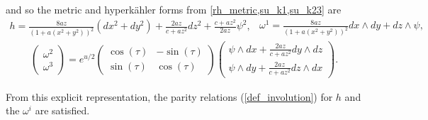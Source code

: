 \documentclass[a4paper,12pt, onecolumn, notitlepage]{article}
\theoremstyle{definition}
\theoremstyle{remark}
\newcommand{\w}{\omega}
\newcommand{\HK}{hyperk\"ahler }
\begin{document}
	and so the metric and \HK forms from \cref{rh_metric,su_k1,su_k23} are
\begin{subequations}
	\begin{gather}
	\label{su_metric}
	h = \frac{8az}{(1+a(x^{2} + y^{2}))^{2}}(dx^{2}+dy^{2}) + \frac{2az}{c+az^{2}}dz^{2} +
	\frac{c+az^{2}}{2az}\psi^{2},
	\end{gather}
	\begin{gather}
	\label{su_kahler1}
	\w^{1} = \frac{8az}{(1+a(x^{2} + y^{2}))^{2}}dx\wedge dy + dz \wedge \psi,
	\end{gather}
\end{subequations}
\begin{gather}
	\begin{pmatrix}
	\w^{2}\\
	\w^{3}
	\end{pmatrix}
	=
	e^{u/2}
	\begin{pmatrix}
	\cos(\tau) & -\sin(\tau) \\
	\sin(\tau) & \cos(\tau)
	\end{pmatrix}
	\begin{pmatrix}
	\psi\wedge dx + \frac{2az}{c+az^{2}}dy\wedge dz\\
	\psi\wedge dy + \frac{2az}{c+az^{2}}dz\wedge dx
	\end{pmatrix}.
\end{gather}

From this explicit representation, the parity relations (\ref{def_involution}) for $h$ and the $\w^{i}$ are satisfied.\\
	
\end{document}
